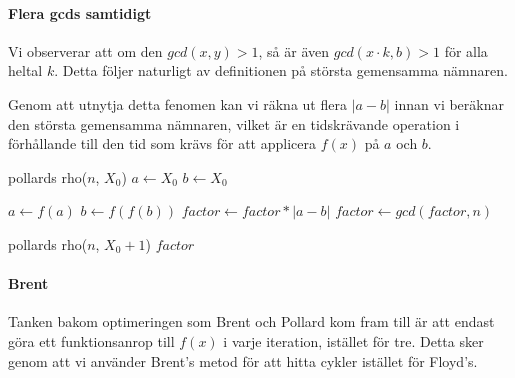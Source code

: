 \documentclass[a4paper,12pt]{article}
\renewcommand{\*}{\ensuremath{\cdot}}
\begin{document}
\paragraph{Flera gcds samtidigt}

Vi observerar att om den $gcd(x, y) > 1$, så är även $gcd(x\cdot k, b)>1$ för alla heltal $k$. Detta följer naturligt av definitionen på största gemensamma nämnaren.

Genom att utnytja detta fenomen kan vi räkna ut flera $|a-b|$ innan vi beräknar den största gemensamma nämnaren, vilket är en tidskrävande operation i förhållande till den tid som krävs för att applicera $f(x)$ på $a$ och $b$.

\begin{algorithmic}
    \STATE pollards rho($n$, $X_0$)
        \STATE $a \gets X_0 $
        \STATE $b \gets X_0 $

                \STATE $a \gets f(a)$
                \STATE $b \gets f(f(b))$
                \STATE $factor \gets factor * |a-b|$
            \ENDFOR
            \STATE $factor \gets gcd(factor, n)$
        \ENDWHILE

            \STATE {}
            \RETURN pollards rho($n$, $X_0+1$) 
            \RETURN $factor$
        \ENDIF
\end{algorithmic}

\paragraph{Brent}

Tanken bakom optimeringen som Brent och Pollard kom fram till är att endast göra ett funktionsanrop till $f(x)$ i varje iteration, istället för tre. Detta sker genom att vi använder Brent's metod för att hitta cykler istället för Floyd's. 
\end{document}

